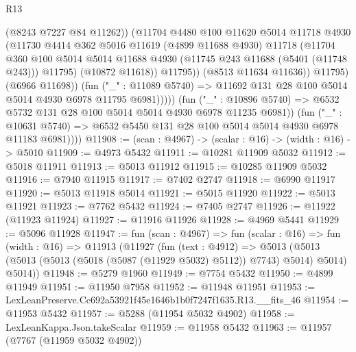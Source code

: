 \begin{lexlean}{R13}
\begin{coremodule}
                              (@8243 @7227 @84 @11262))
                            (@11704
                              @4480
                              @100
                              @11620
                              @5014
                              @11718
                              @4930
                              (@11730
                                @4414
                                @362
                                @5016
                                @11619
                                (@4899 @11688 @4930)
                                @11718
                                (@11704
                                  @360
                                  @100
                                  @5014
                                  @5014
                                  @11688
                                  @4930
                                  (@11745 @243 @11688 (@5401 (@11748 @243)))
                                  @11795)
                                (@10872 @11618))
                              @11795))
                          (@8513 @11634 @11636))
                        @11795)
                      (@6966 @11698))
                    (fun ("_" : @11089 @5740) =>
                    @11692 @131 @28 @100 @5014 @5014 @4930 @6978 @11795 @6981)))))
            (fun ("_" : @10896 @5740) =>
            @6532 @5732 @131 @28 @100 @5014 @5014 @4930 @6978 @11235 @6981))
          (fun ("_" : @10631 @5740) =>
          @6532 @5450 @131 @28 @100 @5014 @5014 @4930 @6978 @11183 @6981))))
@11908 := (scan : @4967) -> (scalar : @16) -> (width : @16) -> @5010
@11909 := @4973 @5432
@11911 := @10281 @11909 @5032
@11912 := @5018 @11911
@11913 := @5013 @11912
@11915 := @10285 @11909 @5032
@11916 := @7940 @11915
@11917 := @7402 @2747
@11918 := @6990 @11917
@11920 := @5013 @11918 @5014
@11921 := @5015 @11920
@11922 := @5013 @11921
@11923 := @7762 @5432
@11924 := @7405 @2747
@11926 := @11922 (@11923 @11924)
@11927 := @11916 @11926
@11928 := @4969 @5441
@11929 := @5096 @11928
@11947 := fun (scan : @4967) =>
  fun (scalar : @16) =>
  fun (width : @16) =>
  @11913
    (@11927
      (fun (text : @4912) =>
      @5013 (@5013 (@5013 (@5013 (@5018 (@5087 (@11929 @5032) @5112)) @7743) @5014) @5014) @5014))
@11948 := @5279 @1960
@11949 := @7754 @5432
@11950 := @4899 @11949
@11951 := @11950 @7958
@11952 := @11948 @11951
@11953 := LexLeanPreserve.Cc692a53921f45e1646b1b0f7247f1635.R13.__fits_46
@11954 := @11953 @5432
@11957 := @5288 (@11954 @5032 @4902)
@11958 := LexLeanKappa.Json.takeScalar
@11959 := @11958 @5432
@11963 := @11957 (@7767 (@11959 @5032 @4902))

\end{coremodule}
\end{lexlean}
